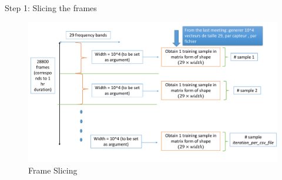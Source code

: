 \documentclass{Beamer}
\begin{document}
\begin{frame}[t]{Step 1: Slicing the frames}

\begin{figure}[h]
\centering
\includegraphics[scale=0.34]{Figures/Data_Preparation_Step_1_Slicing.pdf}
\caption{Frame Slicing}
\end{figure}

\end{frame}
\end{document}
